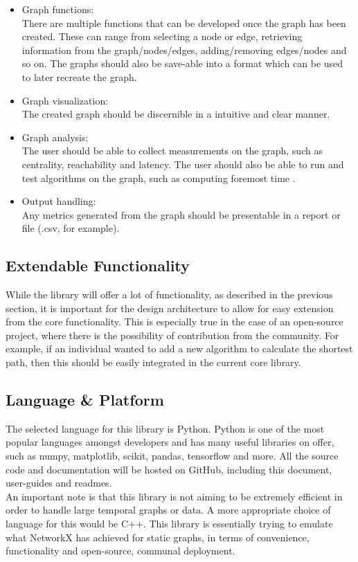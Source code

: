 \begin{specification}
\begin{itemize}
    \item Graph functions:\\
    There are multiple functions that can be developed once the graph has been created. These can range from selecting a node or edge, retrieving information from the graph/nodes/edges, adding/removing edges/nodes and so on. The graphs should also be save-able into a format which can be used to later recreate the graph. 
    \item Graph visualization:\\
    The created graph should be discernible in a intuitive and clear manner.
    \item Graph analysis:\\
    The user should be able to collect measurements on the graph, such as centrality, reachability and latency. The user should also be able to run and test algorithms on the graph, such as computing foremost time \cite{efficient_algorithms}.
    \item Output handling:\\
    Any metrics generated from the graph should be presentable in a report or file (.csv, for example).
\end{itemize}

\subsection{Extendable Functionality}
While the library will offer a lot of functionality, as described in the previous section, it is important for the design architecture to allow for easy extension from the core functionality. This is especially true in the case of an open-source project, where there is the possibility of contribution from the community. For example, if an individual wanted to add a new algorithm to calculate the shortest path, then this should be easily integrated in the current core library.

\subsection{Language \& Platform}
The selected language for this library is Python. Python is one of the most popular languages amongst developers and has many useful libraries on offer, such as numpy, matplotlib, scikit, pandas, tensorflow and more. All the source code and documentation will be hosted on GitHub, including this document, user-guides and readmes.\\
An important note is that this library is not aiming to be extremely efficient in order to handle large temporal graphs or data. A more appropriate choice of language for this would be C++. This library is essentially trying to emulate what NetworkX \cite{NetworkX} has achieved for static graphs, in terms of convenience, functionality and open-source, communal deployment.


\end{specification}
